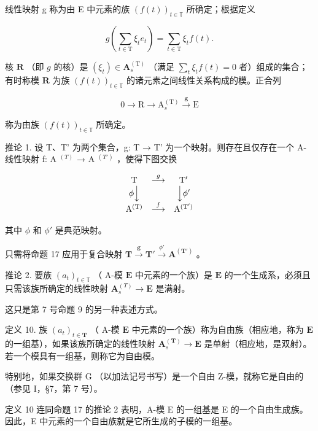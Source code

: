 线性映射 g 称为由 E 中元素的族 \((f(t))_{t\in\mathbb{T}}\) 所确定；根据定义

\[
g \left(\sum_ {t \in \mathrm{T}} \xi_ {t} e _ {t}\right) = \sum_ {t \in \mathrm{T}} \xi_ {t} f (t).\tag{43}
\]

核 \(\mathbf{R}\) （即 \(g\) 的核）是 \((\xi_t) \in \mathbf{A}_s^{(\mathrm{T})}\) （满足 \(\sum_{t} \xi_t f(t) = 0\) 者）组成的集合；有时称模 \(\mathbf{R}\) 为族 \((f(t))_{t \in \mathbb{T}}\) 的诸元素之间线性关系构成的模。正合列

\[
0 \longrightarrow \mathrm{R} \longrightarrow \mathrm{A} _ {s} ^ {(\mathrm{T})} \stackrel {\mathbf {g}} {\longrightarrow} \mathrm{E}\tag{44}
\]

称为由族 \((f(t))_{t\in\mathbb{T}}\) 所确定。

推论 1. 设 T、T' 为两个集合，g: T → T' 为一个映射。则存在且仅存在一个 A-线性映射 f: A \(^{(T)}\) → A \(^{(T')}\) ，使得下图交换

\[
\begin{array}{c c c} \mathrm{T} & \stackrel {{g}} {{\longrightarrow}} & \mathrm{T} ^ {\prime} \\ \phi \Big \downarrow & & \Big \downarrow \phi^ {\prime} \\ \mathrm{A} ^ {(\mathrm{T})} & \stackrel {{f}} {{\longrightarrow}} & \mathrm{A} ^ {(\mathrm{T} ^ {\prime})} \end{array}
\]

其中 \(\phi\) 和 \(\phi'\) 是典范映射。

只需将命题 17 应用于复合映射 \(\mathbf{T} \xrightarrow{\pmb{g}} \mathbf{T}' \xrightarrow{\phi'} \mathbf{A}^{(\mathbf{T}')}\) 。

推论 2. 要族 \((a_{t})_{t\in \mathbb{T}}\) （ A-模 \(\mathbf{E}\) 中元素的一个族）是 \(\mathbf{E}\) 的一个生成系，必须且只需该族所确定的线性映射 \(\mathbf{A}_{s}^{(T)}\to \mathbf{E}\) 是满射。

这只是第 7 号命题 9 的另一种表述方式。

定义 10. 族 \((a_{t})_{t\in \mathbf{T}}\) （ A-模 \(\mathbf{E}\) 中元素的一个族）称为自由族（相应地，称为 \(\mathbf{E}\) 的一组基），如果该族所确定的线性映射 \(\mathbf{A}_{s}^{(\mathbf{T})}\to \mathbf{E}\) 是单射（相应地，是双射）。若一个模具有一组基，则称它为自由模。

特别地，如果交换群 G （以加法记号书写）是一个自由 Z-模，就称它是自由的（参见 I，§7，第 7 号）。

定义 10 连同命题 17 的推论 2 表明，A-模 E 的一组基是 E 的一个自由生成族。因此，E 中元素的一个自由族就是它所生成的子模的一组基。

